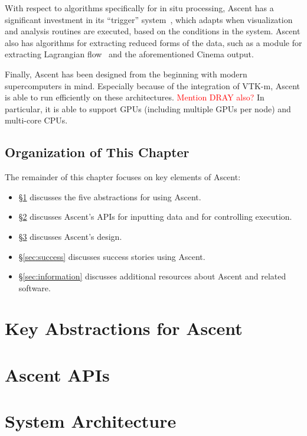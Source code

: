 \documentclass[graybox]{svmult}
\newcommand{\fix}[1]{\textcolor{red}{#1}} %
\begin{document}
With respect to algorithms specifically for in situ processing, Ascent
has a significant investment in its ``trigger'' system~\cite{Larsen:ISAV18},
which adapts when visualization and analysis routines are executed,
based on the conditions in the system.
%
Ascent also has algorithms for extracting reduced forms of the data,
such as a module for extracting Lagrangian flow~\cite{Agranovsky:LDAV2014,Sane:EGPGV19} and the
aforementioned Cinema output.

Finally, Ascent has been designed from the beginning with modern
supercomputers in mind.
%
Especially because of the integration of VTK-m, Ascent is able to
run efficiently on these architectures.
\fix{Mention DRAY also?}
%
In particular, it is able to support GPUs (including multiple GPUs per node) 
and multi-core CPUs.

\subsection{Organization of This Chapter}

The remainder of this chapter focuses on key elements of Ascent:
\begin{itemize}
\item \S\ref{sec:capabilities} discusses the five abstractions for using Ascent.
\item \S\ref{sec:API} discusses Ascent's APIs for inputting
data and for controlling execution.
\item \S\ref{sec:design} discusses Ascent's design.
\item \S\ref{sec:success} discusses success stories using Ascent.
\item \S\ref{sec:information} discusses additional resources about Ascent and related software. 
\end{itemize}


\section{Key Abstractions for Ascent}
\label{sec:capabilities}


\section{Ascent APIs}
\label{sec:API}


\section{System Architecture}
\label{sec:design}

\end{document}

